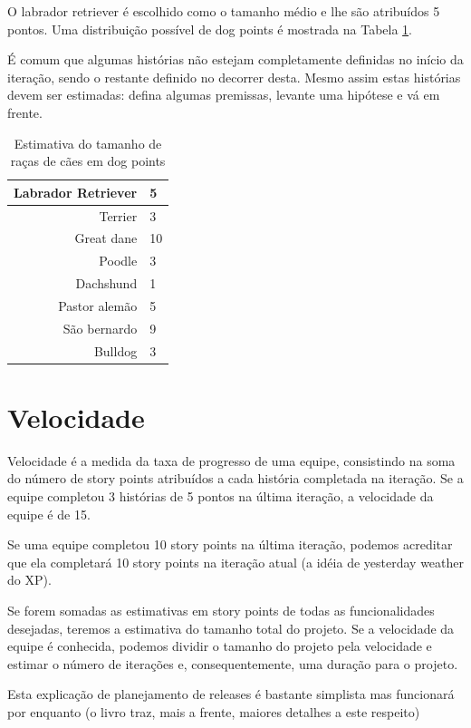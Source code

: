 \documentclass[a4paper,abntfigtabnum,noindentfirst]{abnt}
\begin{document}
O labrador retriever é escolhido como o tamanho médio e lhe são atribuídos 5 pontos. Uma distribuição possível de dog points é mostrada na Tabela \ref{dog-points}.

É comum que algumas histórias não estejam completamente definidas no início da iteração, sendo o restante definido no decorrer desta. Mesmo assim estas histórias devem ser estimadas: defina algumas premissas, levante uma hipótese e vá em frente.

\begin{table}
\caption {Estimativa do tamanho de raças de cães em dog points}
\label{dog-points}
\begin{center}
\begin{tabular}{| r | l |}
\hline
Labrador Retriever & 5\\
\hline
Terrier &3\\
\hline
Great dane & 10\\
\hline
Poodle & 3\\
\hline
Dachshund & 1\\
\hline
Pastor alemão & 5\\
\hline
São bernardo & 9\\
\hline
Bulldog & 3\\
\hline
\end{tabular}
\end{center}
\end{table}


\section{Velocidade}

Velocidade é a medida da taxa de progresso de uma equipe, consistindo na soma do número de story points atribuídos a cada história completada na iteração. Se a equipe completou 3 histórias de 5 pontos na última iteração, a velocidade da equipe é de 15.

Se uma equipe completou 10 story points na última iteração, podemos acreditar que ela completará 10 story points na iteração atual (a idéia de yesterday weather do XP).

Se forem somadas as estimativas em story points de todas as funcionalidades desejadas, teremos a estimativa do tamanho total do projeto. Se a velocidade da equipe é conhecida, podemos dividir o tamanho do projeto pela velocidade e estimar o número de iterações e, consequentemente, uma duração para o projeto.

Esta explicação de planejamento de releases é bastante simplista mas funcionará por enquanto (o livro traz, mais a frente, maiores detalhes a este respeito)
\end{document}

